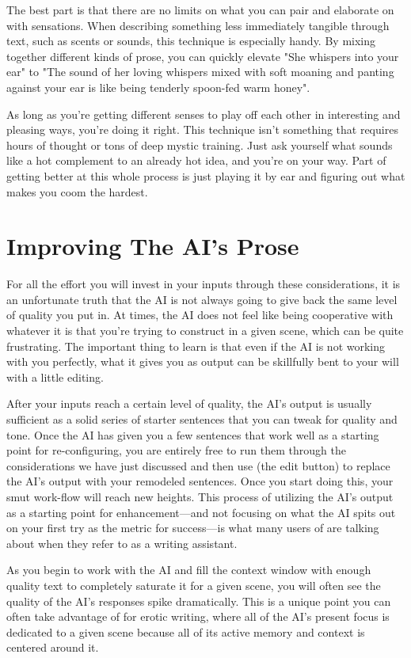 ﻿\documentclass[Coomer-main.tex]{subfiles}
\begin{document}
The best part is that there are no limits on what you can pair and elaborate on with sensations.
When describing something less immediately tangible through text, such as scents or sounds, this technique is especially handy.
By mixing together different kinds of prose, you can quickly elevate "She whispers into your ear" to "The sound of her loving whispers mixed with soft moaning and panting against your ear is like being tenderly spoon-fed warm honey".

As long as you're getting different senses to play off each other in interesting and pleasing ways, you're doing it right.
This technique isn't something that requires hours of thought or tons of deep mystic training.
Just ask yourself what sounds like a hot complement to an already hot idea, and you're on your way.
Part of getting better at this whole process is just playing it by ear and figuring out what makes you coom the hardest.

\section{Improving The AI's Prose}

For all the effort you will invest in your inputs through these considerations, it is an unfortunate truth that the AI is not always going to give back the same level of quality you put in.
At times, the AI does not feel like being cooperative with whatever it is that you're trying to construct in a given scene, which can be quite frustrating.
The important thing to learn is that even if the AI is not working with you perfectly, what it gives you as output can be skillfully bent to your will with a little editing.

After your inputs reach a certain level of quality, the AI's output is usually sufficient as a solid series of starter sentences that you can tweak for quality and tone.
Once the AI has given you a few sentences that work well as a starting point for re-configuring, you are entirely free to run them through the considerations we have just discussed and then use \alt (the edit button) to replace the AI’s output with your remodeled sentences.
Once you start doing this, your smut work-flow will reach new heights.
This process of utilizing the AI's output as a starting point for enhancement—and not focusing on what the AI spits out on your first try as the metric for success—is what many users of \aid are talking about when they refer to \aid as a writing assistant.

As you begin to work with the AI and fill the context window with enough quality text to completely saturate it for a given scene, you will often see the quality of the AI's responses spike dramatically.
This is a unique point you can often take advantage of for erotic writing, where all of the AI's present focus is dedicated to a given scene because all of its active memory and context is centered around it.
\end{document}
